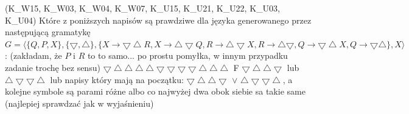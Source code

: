 \answer
{(K\_W15, K\_W03, K\_W04, K\_W07, K\_U15, K\_U21, K\_U22, K\_U03, K\_U04) Które z poniższych napisów są prawdziwe dla języka generowanego przez następującą gramatykę $G = \langle\{Q, P, X\}, \{\bigtriangledown, \bigtriangleup\}, \{X \to \bigtriangledown \bigtriangleup R, X \to \bigtriangleup \bigtriangledown Q, R \to \bigtriangleup \bigtriangledown X, R \to \bigtriangleup \bigtriangledown, Q \to \bigtriangledown \bigtriangleup X, Q \to \bigtriangledown \bigtriangleup\}, X \rangle$: (zakładam, że $P$ i $R$ to to samo... po prostu pomyłka, w innym przypadku zadanie trochę bez sensu)}
{$\bigtriangledown \bigtriangleup \bigtriangleup \bigtriangleup \bigtriangleup \bigtriangledown \bigtriangledown \bigtriangledown \bigtriangledown \bigtriangleup \bigtriangleup \bigtriangleup$}
{F}
{$\bigtriangledown \bigtriangleup \bigtriangleup \bigtriangledown$ lub $\bigtriangleup \bigtriangledown \bigtriangledown \bigtriangleup$ lub napisy który mają na początku: $\bigtriangledown \bigtriangleup \bigtriangleup \bigtriangledown$ $\vee$ $\bigtriangleup \bigtriangledown \bigtriangledown \bigtriangleup$, a kolejne symbole są parami różne albo co najwyżej dwa obok siebie sa takie same (najlepiej sprawdzać jak w wyjaśnieniu)}
